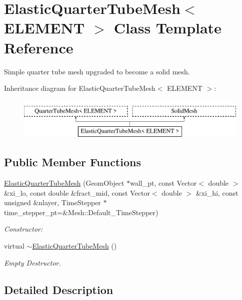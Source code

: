 \hypertarget{classElasticQuarterTubeMesh}{}\section{Elastic\+Quarter\+Tube\+Mesh$<$ E\+L\+E\+M\+E\+NT $>$ Class Template Reference}
\label{classElasticQuarterTubeMesh}


Simple quarter tube mesh upgraded to become a solid mesh.  


Inheritance diagram for Elastic\+Quarter\+Tube\+Mesh$<$ E\+L\+E\+M\+E\+NT $>$\+:\begin{figure}[H]
\begin{center}
\leavevmode
\includegraphics[height=2.000000cm]{classElasticQuarterTubeMesh}
\end{center}
\end{figure}
\subsection*{Public Member Functions}
\begin{DoxyCompactItemize}
\item 
\hyperlink{classElasticQuarterTubeMesh_abb82781bc4c1dc04bdfae437baf49830}{Elastic\+Quarter\+Tube\+Mesh} (Geom\+Object $\ast$wall\+\_\+pt, const Vector$<$ double $>$ \&xi\+\_\+lo, const double \&fract\+\_\+mid, const Vector$<$ double $>$ \&xi\+\_\+hi, const unsigned \&nlayer, Time\+Stepper $\ast$time\+\_\+stepper\+\_\+pt=\&Mesh\+::\+Default\+\_\+\+Time\+Stepper)
\begin{DoxyCompactList}\small\item\em Constructor\+: \end{DoxyCompactList}\item 
virtual \hyperlink{classElasticQuarterTubeMesh_a9ad9db1a8cb86650b505c73fe81eb73c}{$\sim$\+Elastic\+Quarter\+Tube\+Mesh} ()
\begin{DoxyCompactList}\small\item\em Empty Destructor. \end{DoxyCompactList}\end{DoxyCompactItemize}


\subsection{Detailed Description}
